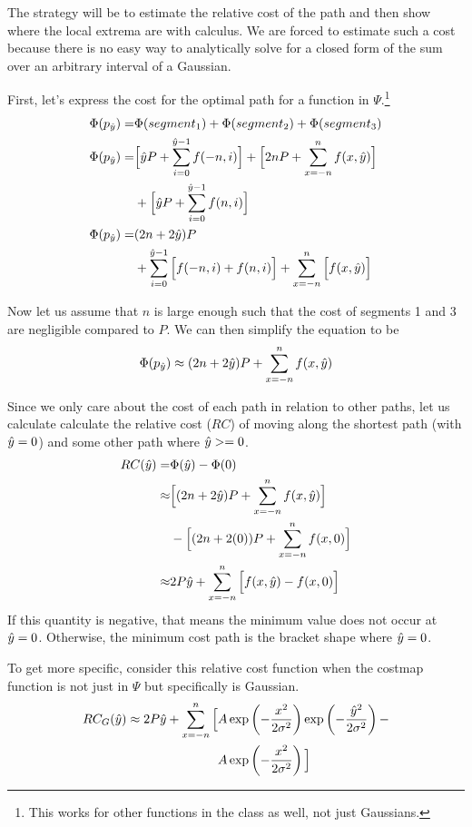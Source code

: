 The strategy will be to estimate the relative cost of the path and then show where the local extrema are with calculus. We are forced to estimate such a cost because there is no easy way to analytically solve for a closed form of the sum over an arbitrary interval of a Gaussian. 

First, let's express the cost for the optimal path for a function in $\Psi$.\footnote{This works for other functions in the class as well, not just Gaussians.}
\begin{align*}
\Phi(p_{\hat{y}}) =&\Phi(segment_1) + \Phi(segment_2) + \Phi(segment_3) \\
\Phi(p_{\hat{y}}) =&\Big[\hat{y} P + \sum\limits_{i=0}^{\hat{y}-1} f(-n, i) \Big] +
         \Big[2nP + \sum\limits_{x=-n}^{n}    f(x,\hat{y}) \Big]\\
     &+\Big[\hat{y} P + \sum\limits_{i=0}^{\hat{y}-1} f(n, i) \Big] \\
\Phi(p_{\hat{y}}) =&(2n+2\hat{y})P \\ &+\sum\limits_{i=0}^{\hat{y}-1} \Big[ f(-n, i) + f(n, i) \Big] + \sum\limits_{x=-n}^{n} \Big[f(x,\hat{y}) \Big]
\end{align*}

Now let us assume that $n$ is large enough such that the cost of segments 1 and 3 are negligible compared to $P$. We can then simplify the equation to be
\[
\Phi(p_{\hat{y}}) \approx (2n+2\hat{y})P +  \sum\limits_{x=-n}^{n} f(x,\hat{y})
\]

Since we only care about the cost of each path in relation to other paths, let us calculate calculate the relative cost ($RC$) of moving along the shortest path (with $\hat{y}=0$) and some other path where $\hat{y}>=0$. 
\begin{align*}
RC(\hat{y}) =& \Phi(\hat{y})-\Phi(0) \\
\approx& \Big[(2n+2\hat{y})P +  \sum\limits_{x=-n}^{n} f(x,\hat{y}) \Big] \\
 & - \Big[(2n+2(0))P +  \sum\limits_{x=-n}^{n} f(x,0) \Big] \\
\approx& 2P\hat{y} + \sum\limits_{x=-n}^{n} \Big[ f(x,\hat{y})-f(x,0) \Big]
\end{align*}
If this quantity is negative, that means the minimum value does not occur at $\hat{y}=0$. Otherwise, the minimum cost path is the bracket shape where $\hat{y}=0$.

To get more specific, consider this relative cost function when the costmap function is not just in $\Psi$ but specifically is Gaussian. 
\begin{align*}
RC_G(\hat{y}) \approx 2P\hat{y} + \sum\limits_{x=-n}^{n} \Big[ &A\exp\left(-\frac{x^2}{2\sigma^2}\right)\exp\left(-\frac{\hat{y}^2}{2\sigma^2}\right) -\\
                                                           &A\exp\left(-\frac{x^2}{2\sigma^2}\right) \Big] 
\end{align*}

